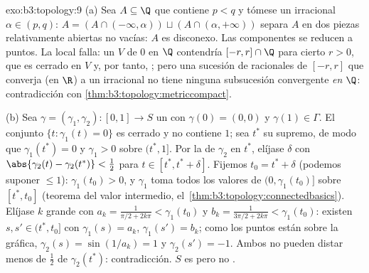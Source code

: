 \begin{solution}{exo:b3:topology:9}
(a) Sea $A \subseteq \Q$ que contiene $p < q$ y tómese un irracional
$\alpha \in (p, q)$: $A = (A \cap (-\infty, \alpha)) \sqcup
(A\cap(\alpha, +\infty))$ separa $A$ en dos piezas relativamente
abiertas no vacías: $A$ es disconexo. Las componentes se reducen a
puntos. La  local falla: un
 $V$ de $0$ en $\Q$ contendría
$[-r, r]\cap\Q$ para cierto $r > 0$, que es cerrado en $V$ y, por tanto,
; pero una sucesión de
racionales de $[-r,r]$ que converja (en $\R$) a un irracional no tiene
ninguna subsucesión convergente \emph{en $\Q$}: contradicción con
\cref{thm:b3:topology:metriccompact}.

(b) Sea $\gamma = (\gamma_1, \gamma_2) \colon [0,1] \to S$ un
 con $\gamma(0) = (0,0)$ y
$\gamma(1) \in \Gamma$. El conjunto $\{t : \gamma_1(t) = 0\}$ es cerrado
y no contiene $1$; sea $t^*$ su supremo, de modo que $\gamma_1(t^*) = 0$
y $\gamma_1 > 0$ sobre $(t^*, 1]$. Por la
 de $\gamma_2$ en $t^*$,
elíjase $\delta$ con $\abs{\gamma_2(t) -
\gamma_2(t^*)} < \tfrac12$ para $t \in [t^*, t^* + \delta]$. Fijemos
$t_0 = t^* + \delta$ (podemos suponer $\leq 1$): $\gamma_1(t_0) > 0$, y
$\gamma_1$ toma todos los valores de $(0, \gamma_1(t_0)]$ sobre
$[t^*, t_0]$ (teorema del valor intermedio,
el~\cref{thm:b3:topology:connectedbasics}). Elíjase $k$ grande con
$a_k = \frac1{\pi/2 + 2k\pi} < \gamma_1(t_0)$ y $b_k =
\frac1{3\pi/2 + 2k\pi} < \gamma_1(t_0)$: existen $s, s' \in
(t^*, t_0]$ con $\gamma_1(s) = a_k$, $\gamma_1(s') = b_k$; como los
puntos están sobre la gráfica, $\gamma_2(s) = \sin(1/a_k) =
1$ y $\gamma_2(s') = -1$. Ambos no pueden distar menos de $\frac12$ de
$\gamma_2(t^*)$: contradicción. $S$ es
 pero no
.
\end{solution}

